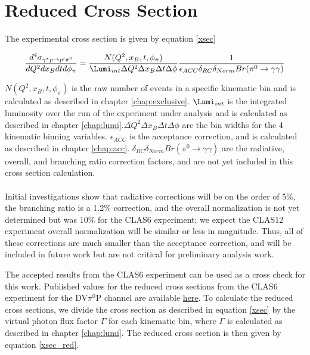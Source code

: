 \section{Reduced Cross Section}

The experimental cross section is given by equation \ref{xsec}

 \begin{equation}\label{xsec}
     \frac{d^4\sigma_{\gamma^*p \rightarrow p'\pi^0}}{dQ^2dx_Bdtd\phi_{\pi}} = \frac{N(Q^2,x_B,t,\phi_{\pi})}{\Lumi_{int}\Delta Q^2\Delta x_B\Delta t\Delta \phi} \frac{1}{\epsilon_{ACC} \delta_{RC} \delta_{Norm} Br(\pi^0 \rightarrow \gamma \gamma)}
\end{equation}

$N(Q^2,x_B,t,\phi_{\pi})$ is the raw number of events in a specific kinematic bin and is calculated as described in chapter \ref{chap:exclusive}. $\Lumi_{int}$ is the integrated luminosity over the run of the experiment under analysis and is calculated as described in chapter \ref{chap:lumi}.$\Delta Q^2\Delta x_B\Delta t\Delta \phi$ are the bin widths for the 4 kinematic binning variables. $\epsilon_{ACC}$ is the acceptance correction, and is calculated as described in chapter \ref{chap:acc}. $\delta_{RC} \delta_{Norm} Br(\pi^0 \rightarrow \gamma \gamma)$ are the radiative, overall, and branching ratio correction factors, and are not yet included in this cross section calculation. 
\\~\\
Initial investigations show that radiative corrections will be on the order of 5\%, the branching ratio is a 1.2\% correction, and the overall normalization is not yet determined but was 10\% for the CLAS6 experiment; we expect the CLAS12 experiment overall normalization will be similar or less in magnitude. Thus, all of these corrections are much smaller than the acceptance correction, and will be included in future work but are not critical for preliminary analysis work.

The accepted results from the CLAS6 experiment \cite{Bedlinskiy2014} can be used as a cross check for this work. Published values for the reduced cross sections from the CLAS6 experiment for the DV$\pi^0$P channel are available \href{https://journals.aps.org/prc/supplemental/10.1103/PhysRevC.90.025205}{here}. To calculate the reduced cross sections, we divide the cross section as described in equation \ref{xsec} by the virtual photon flux factor $\Gamma$ for each kinematic bin, where $\Gamma$ is calculated as described in chapter \ref{chap:lumi}. The reduced cross section is then given by equation \ref{xsec_red}.

